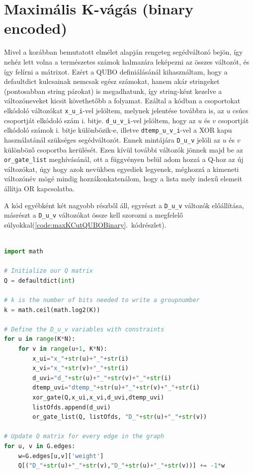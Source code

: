 \section{Maximális K-vágás (binary encoded)}\label{sec:practiceBinary}

Mivel a korábban bemutatott elmélet alapján rengeteg segédváltozó bejön, így nehéz lett volna a természetes számok halmazára leképezni az összes változót, és így felírni a mátrixot. Ezért a QUBO definiálásánál kihasználtam, hogy a defaultdict kulcsainak nemcsak egész számokat, hanem akár stringeket (pontosabban string párokat) is megadhatunk, így string-ként kezelve a változóneveket kicsit követhetőbb a folyamat. Ezáltal a kódban a csoportokat elkódoló változókat \verb+x_u_i+-vel jelöltem, melynek jelentése továbbra is, az $u$ csúcs csoportját elkódoló szám i. bitje. \verb+d_u_v_i+-vel jelöltem, hogy az $u$ és $v$ csoportját elkódoló számok i. bitje különbözik-e, illetve \verb+dtemp_u_v_i+-vel a XOR kapu használatánál szükséges segédváltozót. Ennek mintájára \verb+D_u_v+ jelöli az $u$ és $v$ különböző csoportba kerülését. Ezen kívül további változók jönnek majd be az \verb+or_gate_list+ meghívásánál, ott a függvényen belül adom hozzá a Q-hoz az új változókat, úgy hogy azok nevükben egyediek legyenek, méghozzá a kimeneti változónév mögé mindig hozzákonkatenálom, hogy a lista mely indexű elemeit állítja OR kapcsolatba.

A kód egyébként két nagyobb részből áll, egyrészt a \verb+D_u_v+ változók előállítása, másrészt a  \verb+D_u_v+ változókat össze kell szorozni a megfelelő súlyokkal(\ref{code:maxKCutQUBOBinary}.~kódrészlet).

\begin{lstlisting}[language=python,caption=Max-K-cut QUBO (bináris kódolás),label=code:maxKCutQUBOBinary]

import math

# Initialize our Q matrix
Q = defaultdict(int)

# k is the number of bits needed to write a groupnumber
k = math.ceil(math.log2(K))

# Define the D_u_v variables with constraints
for u in range(K*N):
	for v in range(u+1, K*N):
		x_ui="x_"+str(u)+"_"+str(i)
		x_vi="x_"+str(v)+"_"+str(i)
		d_uvi="d_"+str(u)+"_"+str(v)+"_"+str(i)
		dtemp_uvi="dtemp_"+str(u)+"_"+str(v)+"_"+str(i)
		xor_gate(Q,x_ui,x_vi,d_uvi,dtemp_uvi)
		listOfds.append(d_uvi)
		or_gate_list(Q, listOfds, "D_"+str(u)+"_"+str(v))

# Update Q matrix for every edge in the graph
for u, v in G.edges:
	w=G.edges[u,v]['weight']
	Q[("D_"+str(u)+"_"+str(v),"D_"+str(u)+"_"+str(v))] += -1*w

\end{lstlisting}

